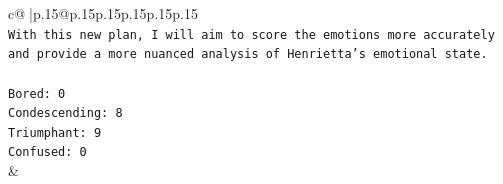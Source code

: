 \documentclass{article}
\begin{document}
{\begin{supertabular}{c@{$\;$}|p{.15\linewidth}@{}p{.15\linewidth}p{.15\linewidth}p{.15\linewidth}p{.15\linewidth}p{.15\linewidth}}
{{{\\ 
\texttt{With this new plan, I will aim to score the emotions more accurately and provide a more nuanced analysis of Henrietta's emotional state.} \\
\\ 
\texttt{Bored: 0} \\
\texttt{Condescending: 8} \\
\texttt{Triumphant: 9} \\
\texttt{Confused: 0} \\
            }
        }
    }
    & \\ \\

\end{supertabular}
}
\end{document}
